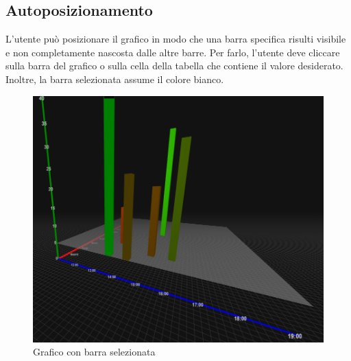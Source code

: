\subsection{Autoposizionamento}
L'utente può posizionare il grafico in modo che una barra specifica risulti
visibile e non completamente nascosta dalle altre barre. 
Per farlo, l'utente deve cliccare sulla barra del grafico o sulla
cella della tabella che contiene il valore desiderato. Inoltre, la barra
selezionata assume il colore bianco.
\begin{figure}[h!]
    \centering
    \includegraphics[scale=0.6]{template/images/avgplane.png}
    \caption{Grafico con barra selezionata}
\end{figure}